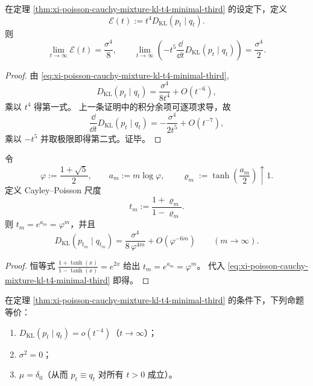 \begin{theorem}[归一化熵能与耗散率极限]\label{cor:xi-poisson-cauchy-mixture-i1-t5-minimal-third}
在定理 \ref{thm:xi-poisson-cauchy-mixture-kl-t4-minimal-third} 的设定下，定义
\[
\mathcal E(t):=t^4D_{\mathrm{KL}}(p_t\mid q_t).
\]
则
\[
\lim_{t\to\infty}\mathcal E(t)=\frac{\sigma^4}{8},
\qquad
\lim_{t\to\infty}\left(-t^5\frac{\dd}{\dd t}D_{\mathrm{KL}}(p_t\mid q_t)\right)=\frac{\sigma^4}{2}.
\]
\end{theorem}

\begin{proof}
由 \eqref{eq:xi-poisson-cauchy-mixture-kl-t4-minimal-third},
\[
D_{\mathrm{KL}}(p_t\mid q_t)
=\frac{\sigma^4}{8t^4}+O(t^{-6}),
\]
乘以 \(t^4\) 得第一式。
上一条证明中的积分余项可逐项求导，故
\[
\frac{\dd}{\dd t}D_{\mathrm{KL}}(p_t\mid q_t)
=-\frac{\sigma^4}{2t^5}+O(t^{-7}),
\]
乘以 \(-t^5\) 并取极限即得第二式。证毕。
\end{proof}

\begin{corollary}[黄金分辨率链上的四阶衰减律]\label{cor:xi-poisson-cauchy-mixture-golden-exponent4-barrier}
令
\[
\varphi:=\frac{1+\sqrt5}{2},\qquad
a_m:=m\log\varphi,\qquad
\varrho_m:=\tanh\!\left(\frac{a_m}{2}\right)\uparrow 1.
\]
定义 Cayley--Poisson 尺度
\[
t_m:=\frac{1+\varrho_m}{1-\varrho_m}.
\]
则 \(t_m=e^{a_m}=\varphi^m\)，并且
\[
D_{\mathrm{KL}}(p_{t_m}\mid q_{t_m})
=\frac{\sigma^4}{8\,\varphi^{4m}}
+O\!\left(\varphi^{-6m}\right)
\qquad(m\to\infty).
\]
\end{corollary}

\begin{proof}
恒等式 \(\frac{1+\tanh(x)}{1-\tanh(x)}=e^{2x}\) 给出 \(t_m=e^{a_m}=\varphi^m\)。
代入 \eqref{eq:xi-poisson-cauchy-mixture-kl-t4-minimal-third} 即得。
\end{proof}

\begin{theorem}[四阶尺度的刚性判别]\label{thm:xi-poisson-cauchy-mixture-t4-optimality-rigidity}
在定理 \ref{thm:xi-poisson-cauchy-mixture-kl-t4-minimal-third} 的条件下，下列命题等价：
\begin{enumerate}
  \item \(D_{\mathrm{KL}}(p_t\mid q_t)=o(t^{-4})\)（\(t\to\infty\)）；
  \item \(\sigma^2=0\)；
  \item \(\mu=\delta_0\)（从而 \(p_t\equiv q_t\) 对所有 \(t>0\) 成立）。
\end{enumerate}
\end{theorem}

